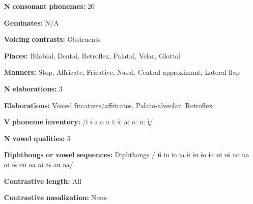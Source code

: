 \documentclass[output=paper]{langsci/langscibook}
\begin{document}
\begin{styleBody}
\textbf{N} \textbf{consonant} \textbf{phonemes:} 20
\end{styleBody}

\begin{styleBody}
\textbf{Geminates:} N/A
\end{styleBody}

\begin{styleBody}
\textbf{Voicing} \textbf{contrasts:} Obstruents
\end{styleBody}

\begin{styleBody}
\textbf{Places:} Bilabial, Dental, Retroflex, Palatal, Velar, Glottal
\end{styleBody}

\begin{styleBody}
\textbf{Manners:} Stop, Affricate, Fricative, Nasal, Central approximant, Lateral flap
\end{styleBody}

\begin{styleBody}
\textbf{N} \textbf{elaborations:} 3
\end{styleBody}

\begin{styleBody}
\textbf{Elaborations:} Voiced fricatives/affricates, Palato-alveolar, Retroflex
\end{styleBody}

\begin{styleBody}
\textbf{V} \textbf{phoneme} \textbf{inventory:} /i ɨ a o u iː ɨː aː oː uː i̥/
\end{styleBody}

\begin{styleBody}
\textbf{N} \textbf{vowel} \textbf{qualities:} 5
\end{styleBody}

\begin{styleBody}
\textbf{Diphthongs} \textbf{or} \textbf{vowel} \textbf{sequences:} Diphthongs / iɨ iu io ia ɨi ɨu ɨo ɨa ui uɨ uo ua oi oɨ ou oa ai aɨ au oa/
\end{styleBody}

\begin{styleBody}
\textbf{Contrastive} \textbf{length:} All
\end{styleBody}

\begin{styleBody}
\textbf{Contrastive} \textbf{nasalization:} None
\end{styleBody}
\end{document}
